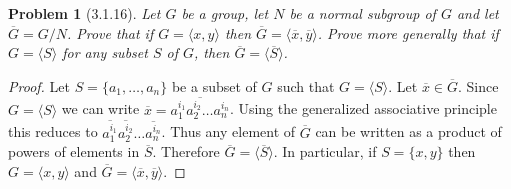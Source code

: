 \documentclass{article}
\newtheorem{problem}{Problem}
\begin{document}
\begin{problem}[3.1.16]
Let $G$ be a group, let $N$ be a normal subgroup of $G$ and let $\overline{G} = G/N$. Prove that if $G = \langle x, y \rangle$ then $\overline{G} = \langle \overline{x}, \overline{y}\rangle$. Prove more generally that if $G = \langle S \rangle$ for any subset $S$ of $G$, then $\overline{G} = \langle \overline{S} \rangle$.
\end{problem}
\begin{proof}
Let $S = \{a_1, \dots , a_n\}$ be a subset of $G$ such that $G = \langle S \rangle$. Let $\overline{x} \in \overline{G}$. Since $G = \langle S \rangle$ we can write $\overline{x} = \overline{a_1^{i_1}a_2^{i_2} \dots a_n^{i_n}}$. Using the generalized associative principle this reduces to $\overline{a_1^{i_1}} \overline{a_2^{i_2}} \dots \overline{a_n^{i_n}}$. Thus any element of $\overline{G}$ can be written as a product of powers of elements in $\overline{S}$. Therefore $\overline{G} = \langle \overline{S} \rangle$. In particular, if $S = \{x, y\}$ then $G = \langle x, y \rangle$ and $\overline{G} = \langle \overline{x}, \overline{y} \rangle$.
\end{proof}
\end{document}
